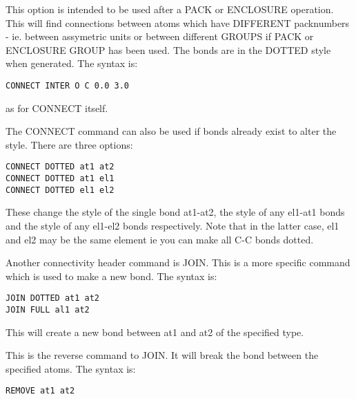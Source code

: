 \documentclass[10pt,a4paper]{report}
\begin{document}
\bigskip{}


This option is intended to be used after a PACK or ENCLOSURE 
operation. This will find connections between atoms which have DIFFERENT
packnumbers - ie. between assymetric units or between different GROUPS 
if PACK or ENCLOSURE GROUP has been used. The bonds are in the DOTTED 
style when generated. The syntax is:
\small\begin{verbatim}
CONNECT INTER O C 0.0 3.0
\end{verbatim}\normalsize


as for CONNECT itself.


\bigskip{}


\bigskip{}


The CONNECT command can also be used if bonds already exist to
alter the
style. There are three options:
\small\begin{verbatim}
CONNECT DOTTED at1 at2
CONNECT DOTTED at1 el1
CONNECT DOTTED el1 el2
\end{verbatim}\normalsize


These change the style of the single bond at1-at2, the
style
of any el1-at1 bonds and the style of any el1-el2 bonds respectively. Note
that in
the latter case, el1 and el2 may be the same element ie you can
make all
C-C bonds dotted.





\bigskip{}




\bigskip{}


\bigskip{}


Another connectivity header command is JOIN. This is a more
specific
command which is used to make a new bond. The syntax is:
\small\begin{verbatim}
JOIN DOTTED at1 at2
JOIN FULL al1 at2
\end{verbatim}\normalsize


This will create a new bond between at1 and at2 of the specified type.


\bigskip{}


This is the reverse command to JOIN. It will break the bond between 
the specified atoms. The syntax is:
\small\begin{verbatim}
REMOVE at1 at2
\end{verbatim}\normalsize




\bigskip{}
\end{document}
